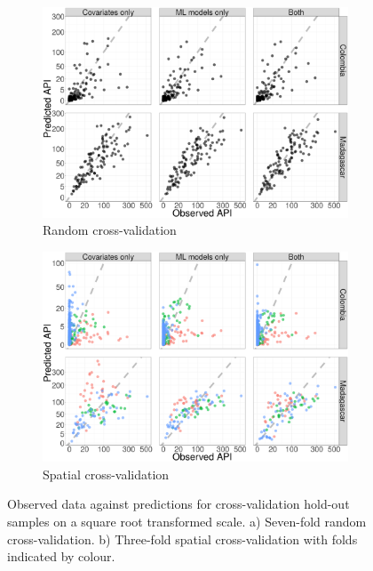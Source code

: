\documentclass[11pt]{article}
\begin{document}
\begin{figure}
\centering
    \begin{subfigure}[b]{0.49\textwidth}
        \includegraphics[width=\textwidth]{figs/cv1_scatter.png}
        \caption{Random cross-validation}
        \label{fig:cv1}
    \end{subfigure}
    \begin{subfigure}[b]{0.49\textwidth}
        \includegraphics[width=\textwidth]{figs/cv2_scatter.png}
        \caption{Spatial cross-validation}
        \label{fig:cv1}
    \end{subfigure}
\caption{
  Observed data against predictions for cross-validation hold-out samples on a square root transformed scale.
  a) Seven-fold random cross-validation.
  b) Three-fold spatial cross-validation with folds indicated by colour.
}
\label{f:scatter}
\end{figure}
\end{document}
